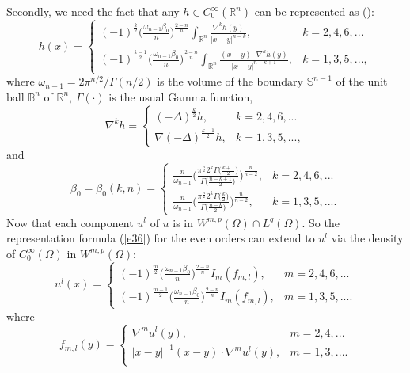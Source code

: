 \documentclass[12pt]{amsart}
\begin{document}
Secondly, we need the fact that any $h\in C_0^\infty(\mathbb R^n)$ can be represented as
(\cite[Lemma 2]{AAnn}):
\begin{equation}\label{e36}
h(x)=\begin{cases}
(-1)^\frac{k}{2}\Big(\frac{\omega_{n-1}\beta_0}{n}\Big)^\frac{2-n}{n}\int_{\mathbb
R^n}\frac{\nabla^k h(y)}{|x-y|^{n-k}}, & k=2,4, 6,...\\
(-1)^\frac{k-1}{2}\Big(\frac{\omega_{n-1}\beta_0}{n}\Big)^\frac{2-n}{n}\int_{\mathbb
R^n}\frac{(x-y)\cdot\nabla^k h(y)}{|x-y|^{n-k+1}}, & k=1,3,5,...,
\end{cases}
\end{equation}
where $\omega_{n-1}=2\pi^{n/2}/\Gamma(n/2)$ is the volume of the
boundary $\mathbb S^{n-1}$ of the unit ball $\mathbb B^n$ of
$\mathbb R^n$, $\Gamma(\cdot)$ is the usual Gamma function,
$$
\nabla^k h=\begin{cases}
(-\Delta)^\frac{k}{2}h, & k=2,4,6,...\\
\nabla(-\Delta)^\frac{k-1}{2}h, & k=1,3,5,...,
\end{cases}
$$
and
$$
\beta_0=\beta_0(k,n)=
\begin{cases}
\frac{n}{\omega_{n-1}}\Big(\frac{\pi^\frac{n}{2}2^k\Gamma\big(\frac{k+1}{2}\big)}{\Gamma\big(\frac{n-k+1}{2}\big)}\Big)^\frac{n}{n-2},
& k=2,4,6,...\\
\frac{n}{\omega_{n-1}}\Big(\frac{\pi^\frac{n}{2}2^k\Gamma\big(\frac{k}{2}\big)}{\Gamma\big(\frac{n-k}{2}\big)}\Big)^\frac{n}{n-2},
& k=1,3,5,....
\end{cases}
$$
Now that each component $u^l$ of $u$ is in $W^{m,p}(\Omega)\cap L^{q}(\Omega)$. So the representation formula (\ref{e36}) for the even
orders can extend to $u^l$ via the density of
$C^\infty_0(\Omega)$ in $W^{m,p}(\Omega)$:
\begin{equation*}
u^l(x)=\begin{cases}
(-1)^\frac{m}{2}\Big(\frac{\omega_{n-1}\beta_0}{n}\Big)^\frac{2-n}{n}I_m(f_{m,l}), & m=2,4,6,...\\
(-1)^\frac{m-1}{2}\Big(\frac{\omega_{n-1}\beta_0}{n}\Big)^\frac{2-n}{n}I_m(f_{m,l}),
& m=1,3,5,....
\end{cases}
\end{equation*}
where
\begin{equation*}
f_{m,l}(y)=\begin{cases}\nabla^m u^l(y), & m=2,4,...\\
|x-y|^{-1}(x-y)\cdot\nabla^m u^l(y), & m=1,3,....\\
\end{cases}
\end{equation*}
\end{document}
